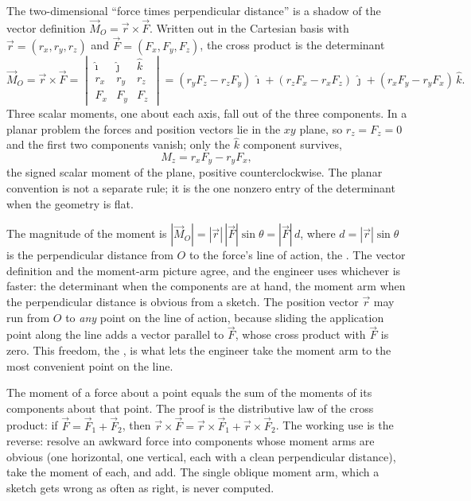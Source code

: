 The two-dimensional ``force times perpendicular distance'' is a shadow of
the vector definition $\vec{M}_O = \vec{r} \times \vec{F}$. Written out in
the Cartesian basis with $\vec{r} = (r_x, r_y, r_z)$ and
$\vec{F} = (F_x, F_y, F_z)$, the cross product is the determinant
\[
\vec{M}_O = \vec{r} \times \vec{F}
= \begin{vmatrix}
\hat{\imath} & \hat{\jmath} & \hat{k} \\
r_x & r_y & r_z \\
F_x & F_y & F_z
\end{vmatrix}
= (r_y F_z - r_z F_y)\,\hat{\imath}
+ (r_z F_x - r_x F_z)\,\hat{\jmath}
+ (r_x F_y - r_y F_x)\,\hat{k}.
\]
Three scalar moments, one about each axis, fall out of the three
components. In a planar problem the forces and position vectors lie in the
$xy$ plane, so $r_z = F_z = 0$ and the first two components vanish; only
the $\hat{k}$ component survives,
\[
M_z = r_x F_y - r_y F_x,
\]
the signed scalar moment of the plane, positive counterclockwise. The
planar convention is not a separate rule; it is the one nonzero entry of
the determinant when the geometry is flat.

The magnitude of the moment is $|\vec{M}_O| = |\vec{r}|\,|\vec{F}|\sin\theta
= |\vec{F}|\,d$, where $d = |\vec{r}|\sin\theta$ is the perpendicular
distance from $O$ to the force's line of action, the .
The vector definition and the moment-arm picture agree, and the engineer
uses whichever is faster: the determinant when the components are at hand,
the moment arm when the perpendicular distance is obvious from a sketch.
The position vector $\vec{r}$ may run from $O$ to \emph{any} point on the
line of action, because sliding the application point along the line adds a
vector parallel to $\vec{F}$, whose cross product with $\vec{F}$ is zero.
This freedom, the , is what lets the
engineer take the moment arm to the most convenient point on the line.

\begin{principle}
The moment of a force about a point equals the sum of the moments of its
components about that point. The proof is the distributive law of the cross
product: if $\vec{F} = \vec{F}_1 + \vec{F}_2$, then
$\vec{r}\times\vec{F} = \vec{r}\times\vec{F}_1 + \vec{r}\times\vec{F}_2$.
The working use is the reverse: resolve an awkward force into components
whose moment arms are obvious (one horizontal, one vertical, each with a
clean perpendicular distance), take the moment of each, and add. The single
oblique moment arm, which a sketch gets wrong as often as right, is never
computed.
\end{principle}

